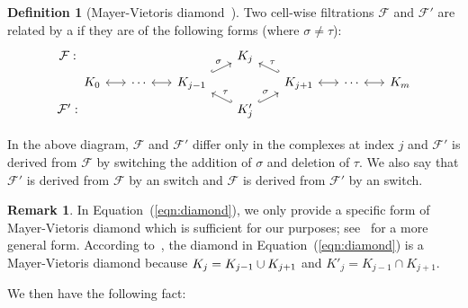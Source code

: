 \documentclass[letterpaper,11pt]{article}
\theoremstyle{mythmstyle}
\theoremstyle{mydefstyle}
\newtheorem{definition}{Definition}
\newtheorem{remark}{Remark}
\theoremstyle{plain}
\theoremstyle{definition}
\newtheorem{definition}[theorem]{Definition}
\newtheorem{remark}[theorem]{Remark}
\newcommand{\<}[1]{\langle #1\rangle}
\let\intersect\cap
\let\intsec\intersect
\let\union\cup
\newcommand{\Fcal}{\mathcal{F}}
\newcommand{\tG}{\tau}
\newcommand{\filtcnt}{m}
\newcommand{\splx}{\sigma}
\begin{document}
\begin{definition}[Mayer-Vietoris diamond~\cite{carlsson2010zigzag}]
\label{dfn:diamond}
Two cell-wise filtrations $\Fcal$ and $\Fcal'$ 
are related by a 
if they are of the following forms {\rm(}where $\splx\neq\tG${\rm)}:
\begin{equation}
\label{eqn:diamond}
\begin{tikzcd}[column sep=1.6em,
  row sep=0.4em,
]
\Fcal: &[-2em] & & & K_j\arrow[rd,hookleftarrow,pos=0.4,"\tG"]
\\
& K_0\arrow[r,leftrightarrow] & 
  \cdots\arrow[r,leftrightarrow] & 
  K_{j-1}\arrow[ur,hookrightarrow,pos=0.65,"\splx"]
  \arrow[dr,hookleftarrow,pos=0.4,"\tG"] 
  & & 
  K_{j+1}
  \arrow[r,leftrightarrow] & 
  \cdots\arrow[r,leftrightarrow] & 
  K_\filtcnt\\
\Fcal': & & & & K'_j\arrow[ru,hookrightarrow,pos=0.65,"\splx"]
\\
\end{tikzcd}
\end{equation}
In the above diagram,
$\Fcal$ and $\Fcal'$ differ only in the complexes at index $j$
and $\Fcal'$ is derived from $\Fcal$ by switching the addition of $\splx$ 
and deletion of $\tG$.
We also say that $\Fcal'$ is derived from $\Fcal$ by an  switch %
and $\Fcal$ is derived from $\Fcal'$ by an  switch.%
\end{definition}


\begin{remark}
In Equation~(\ref{eqn:diamond}),
we only provide a specific form of Mayer-Vietoris diamond
which is sufficient for our purposes;
see~\cite{carlsson2010zigzag,carlsson2009zigzag-realvalue} for a more general form.
According to~\cite{carlsson2010zigzag},
the diamond in Equation~(\ref{eqn:diamond})
is a Mayer-Vietoris diamond 
because $K_j=\linebreak[1]K_{j-1}\union K_{j+1}$
and $K'_j=K_{j-1}\intsec K_{j+1}$.
\end{remark}

We then have the following fact:
\end{document}
